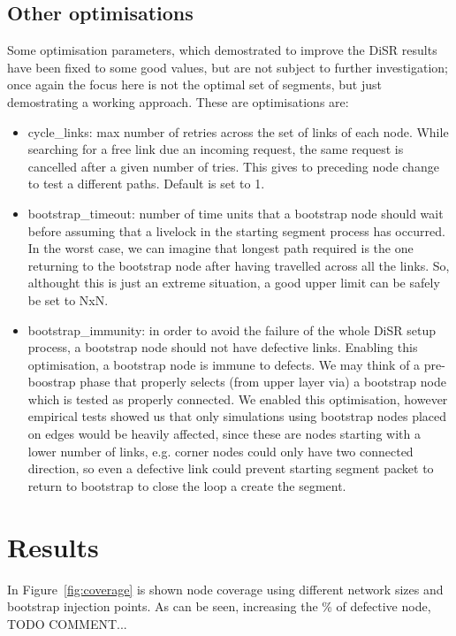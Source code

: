 \subsection{Other optimisations}
Some optimisation parameters, which demostrated to improve the DiSR
results have been fixed to some good values, but are not subject to
further investigation; once again the focus here is not the
optimal set of segments, but just demostrating a working approach. 
These are optimisations are:
\begin{itemize}
\item{cycle\_links}: max number of retries across the set of links of
each node. While searching for a free link due an incoming request,
the same request is cancelled after a given number of tries. This
gives to preceding node change to test a different paths. Default is set to 1.
\item{bootstrap\_timeout}: number of time units that a bootstrap node
should wait before assuming that a livelock in the starting segment
process has occurred. In the worst case, we can imagine that longest
path required is the one returning to the bootstrap node after having
travelled across all the links. So, althought this is just an extreme
situation, a good upper limit can be safely be set to NxN.
\item{bootstrap\_immunity}: in order to avoid the failure of the whole DiSR
setup process, a bootstrap node should not have defective links.
Enabling this optimisation, a bootstrap node is immune to defects.
We may think of a pre-boostrap phase that properly selects (from upper
layer via) a bootstrap node which is tested as properly connected. We
enabled this optimisation, however empirical tests showed us that only
simulations using bootstrap nodes placed on edges would be heavily
affected, since these are nodes starting with a lower number of links,
e.g. corner nodes could only have two connected direction, so even a
defective link could prevent starting segment packet to return to
bootstrap to close the loop a create the segment.

\end{itemize}

\section{Results}
\label{sec:results}


In Figure~\ref{fig:coverage} is shown node coverage using different
network sizes and bootstrap injection points. As can be seen,
increasing the \% of defective node, TODO COMMENT... 

